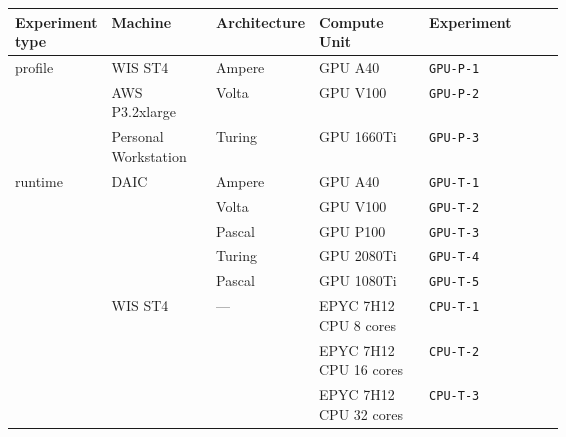 \begin{tabular}{p{0.15\linewidth}p{0.19\linewidth}p{0.10\linewidth}p{0.20\linewidth}l}
\toprule
Experiment type & Machine & \hspace{0pt}Architecture & Compute Unit & Experiment \\
\midrule\midrule
\multirow[t]{3}{*}{\parbox{1\linewidth}{\vspace{1.5cm}profile}} & WIS ST4 & Ampere & GPU A40 & \texttt{GPU-P-1} \\
\cline{2-5} 
 & AWS P3.2xlarge & Volta & GPU V100 & \texttt{GPU-P-2} \\
\cline{2-5} 
 & Personal Workstation & Turing & GPU 1660Ti & \texttt{GPU-P-3} \\
\cline{1-5}
\multirow[t]{8}{*}{\parbox{1\linewidth}{\vspace{4cm}runtime}} & \multirow[t]{5}{*}{\parbox{1\linewidth}{\vspace{2cm}DAIC}} & Ampere & GPU A40 & \texttt{GPU-T-1} \\

 &  & Volta & GPU V100 & \texttt{GPU-T-2} \\

 &  & Pascal & GPU P100 & \texttt{GPU-T-3} \\

 &  & Turing & GPU 2080Ti & \texttt{GPU-T-4} \\

 &  & Pascal & GPU 1080Ti & \texttt{GPU-T-5} \\
\cline{2-5} 
 & \multirow[t]{3}{*}{\parbox{1\linewidth}{\vspace{2.3cm}WIS ST4}} & \multirow[t]{3}{*}{\parbox{1\linewidth}{\vspace{2.3cm}—}} & EPYC 7H12 CPU 8 cores & \texttt{CPU-T-1} \\

 &  &  & EPYC 7H12 CPU 16 cores & \texttt{CPU-T-2} \\

 &  &  & EPYC 7H12 CPU 32 cores & \texttt{CPU-T-3} \\
\cline{1-5}
\bottomrule
\end{tabular}
